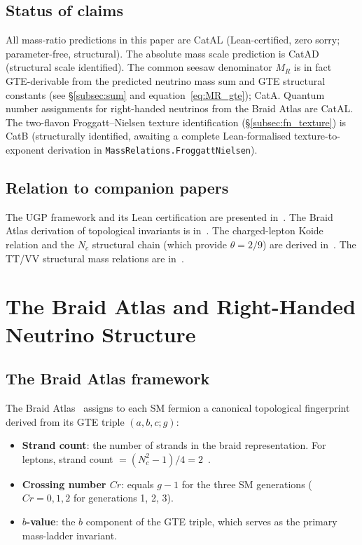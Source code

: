 \documentclass[12pt,a4paper]{article}
\theoremstyle{definition}
\theoremstyle{remark}
\begin{document}
\subsection{Status of claims}
\label{subsec:status}

All mass-ratio predictions in this paper are CatAL (Lean-certified, zero sorry; parameter-free,
structural). The absolute mass scale prediction is CatAD
(structural scale identified). The common seesaw denominator $M_R$ is in
fact GTE-derivable from the predicted neutrino mass sum and GTE structural
constants (see \S\ref{subsec:sum} and equation~\eqref{eq:MR_gte}); CatA.
Quantum number assignments
for right-handed neutrinos from the Braid Atlas are CatAL.
The two-flavon Froggatt--Nielsen texture identification (\S\ref{subsec:fn_texture})
is CatB (structurally identified, awaiting a complete Lean-formalised
texture-to-exponent derivation in \texttt{MassRelations.FroggattNielsen}).

\subsection{Relation to companion papers}
\label{subsec:companions}

The UGP framework and its Lean certification are presented
in~\cite{Spivack2026_SM_UGP,SpivackUGPFormalization}.
The Braid Atlas derivation of topological invariants is
in~\cite{SpivackBraidAtlas}.
The charged-lepton Koide relation and the $N_c$ structural chain
(which provide $\theta = 2/9$) are derived in~\cite{Spivack2026_Koide}.
The TT/VV structural mass relations are in~\cite{Spivack2026_CyclotomicMass}.

\section{The Braid Atlas and Right-Handed Neutrino Structure}
\label{sec:braid}

\subsection{The Braid Atlas framework}
\label{subsec:atlas}

The Braid Atlas~\cite{SpivackBraidAtlas} assigns to each SM fermion
a canonical topological fingerprint derived from its GTE triple $(a,b,c;g)$:
\begin{itemize}[leftmargin=1.3em,itemsep=0.15em]
  \item \textbf{Strand count}: the number of strands in the braid representation.
    For leptons, strand count $= (N_c^2-1)/4 = 2$~\cite{Spivack2026_Koide}.
  \item \textbf{Crossing number $Cr$}: equals $g-1$ for the three SM
    generations ($Cr = 0, 1, 2$ for generations 1, 2, 3).
  \item \textbf{$b$-value}: the $b$ component of the GTE triple,
    which serves as the primary mass-ladder invariant.
\end{itemize}
\end{document}
